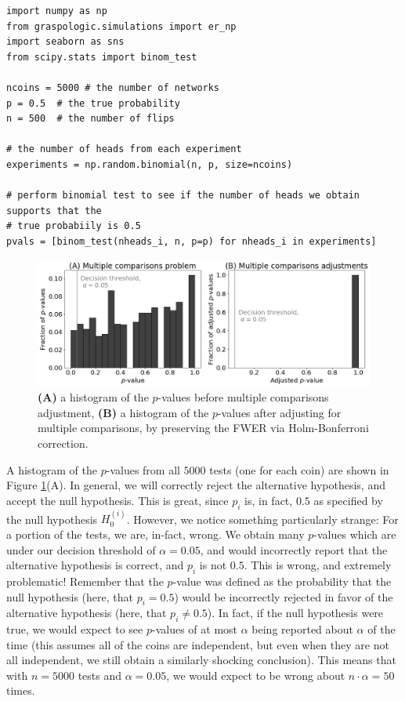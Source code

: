 \begin{lstlisting}[style=python]
import numpy as np
from graspologic.simulations import er_np
import seaborn as sns
from scipy.stats import binom_test

ncoins = 5000 # the number of networks
p = 0.5  # the true probability
n = 500  # the number of flips

# the number of heads from each experiment
experiments = np.random.binomial(n, p, size=ncoins)

# perform binomial test to see if the number of heads we obtain supports that the
# true probabiily is 0.5
pvals = [binom_test(nheads_i, n, p=p) for nheads_i in experiments]
\end{lstlisting}


\begin{figure}
    \centering
    \includegraphics[width=\linewidth]{applications/ch8/Images/twosampsbm_mc.png}
    \caption{\textbf{(A)} a histogram of the $p$-values before multiple comparisons adjustment, \textbf{(B)} a histogram of the $p$-values after adjusting for multiple comparisons, by preserving the FWER via Holm-Bonferroni correction.}
    \label{fig:ch8:twosampsbm:mc}
\end{figure}
A histogram of the $p$-values from all $5000$ tests (one for each coin) are shown in Figure \ref{fig:ch8:twosampsbm:mc}(A). In general, we will correctly reject the alternative hypothesis, and accept the null hypothesis. This is great, since $p_i$ is, in fact, $0.5$ as specified by the null hypothesis $H_{0}^{(i)}$. However, we notice something particularly strange: For a portion of the tests, we are, in-fact, wrong. We obtain many $p$-values which are under our decision threshold of $\alpha = 0.05$, and would incorrectly report that the alternative hypothesis is correct, and $p_i$ is not $0.5$. This is wrong, and extremely problematic! Remember that the $p$-value was defined as the probability that the null hypothesis (here, that $p_i = 0.5$) would be incorrectly rejected in favor of the alternative hypothesis (here, that $p_i \neq 0.5$). In fact, if the null hypothesis were true, we would expect to see $p$-values of at most $\alpha$ being reported about $\alpha$ of the time (this assumes all of the coins are independent, but even when they are not all independent, we still obtain a similarly shocking conclusion). This means that with $n=5000$ tests and $\alpha = 0.05$, we would expect to be wrong about $n\cdot \alpha = 50$ times.


